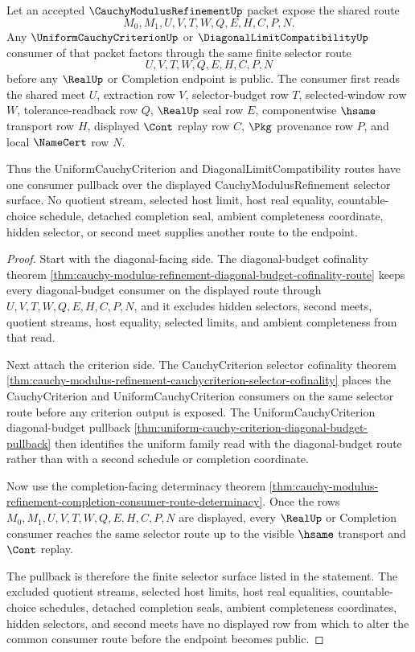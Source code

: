 \begin{theorem}
\label{thm:cauchy-modulus-refinement-uniform-diagonal-consumer-pullback}
Let an accepted $\CauchyModulusRefinementUp$ packet expose the shared route
$$
M_0,M_1,U,V,T,W,Q,E,H,C,P,N.
$$
Any $\UniformCauchyCriterionUp$ or $\DiagonalLimitCompatibilityUp$ consumer of that packet factors through the same finite selector route
$$
U,V,T,W,Q,E,H,C,P,N
$$
before any $\RealUp$ or Completion endpoint is public. The consumer first reads the shared meet $U$, extraction row $V$, selector-budget row $T$, selected-window row $W$, tolerance-readback row $Q$, $\RealUp$ seal row $E$, componentwise $\hsame$ transport row $H$, displayed $\Cont$ replay row $C$, $\Pkg$ provenance row $P$, and local $\NameCert$ row $N$.

Thus the UniformCauchyCriterion and DiagonalLimitCompatibility routes have one consumer pullback over the displayed CauchyModulusRefinement selector surface. No quotient stream, selected host limit, host real equality, countable-choice schedule, detached completion seal, ambient completeness coordinate, hidden selector, or second meet supplies another route to the endpoint.
\end{theorem}
\begin{proof}
Start with the diagonal-facing side. The diagonal-budget cofinality theorem \autoref{thm:cauchy-modulus-refinement-diagonal-budget-cofinality-route} keeps every diagonal-budget consumer on the displayed route through $U,V,T,W,Q,E,H,C,P,N$, and it excludes hidden selectors, second meets, quotient streams, host equality, selected limits, and ambient completeness from that read.

Next attach the criterion side. The CauchyCriterion selector cofinality theorem \autoref{thm:cauchy-modulus-refinement-cauchycriterion-selector-cofinality} places the CauchyCriterion and UniformCauchyCriterion consumers on the same selector route before any criterion output is exposed. The UniformCauchyCriterion diagonal-budget pullback \autoref{thm:uniform-cauchy-criterion-diagonal-budget-pullback} then identifies the uniform family read with the diagonal-budget route rather than with a second schedule or completion coordinate.

Now use the completion-facing determinacy theorem \autoref{thm:cauchy-modulus-refinement-completion-consumer-route-determinacy}. Once the rows $M_0,M_1,U,V,T,W,Q,E,H,C,P,N$ are displayed, every $\RealUp$ or Completion consumer reaches the same selector route up to the visible $\hsame$ transport and $\Cont$ replay.

The pullback is therefore the finite selector surface listed in the statement. The excluded quotient streams, selected host limits, host real equalities, countable-choice schedules, detached completion seals, ambient completeness coordinates, hidden selectors, and second meets have no displayed row from which to alter the common consumer route before the endpoint becomes public.
\end{proof}

